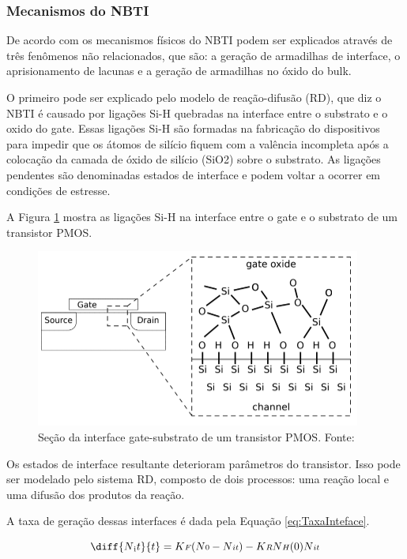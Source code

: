 \subsubsection{Mecanismos do NBTI}

De acordo com \cite{Zeng} os mecanismos físicos do NBTI podem ser explicados através de três fenômenos não relacionados, que são: a geração de armadilhas de interface, o aprisionamento de lacunas e a geração de armadilhas no óxido do bulk.

O primeiro pode ser explicado pelo modelo de reação-difusão (RD), que diz o NBTI é causado por ligações Si-H quebradas na interface entre o substrato e o oxido do gate. Essas ligações Si-H são formadas na fabricação do dispositivos para impedir que os átomos de silício fiquem com a valência incompleta após a colocação da camada de óxido de silício (SiO\small{2}) sobre o substrato. As ligações pendentes são denominadas estados de interface e podem voltar a ocorrer em condições de estresse.

A Figura \ref{fig:PmosCrossSec} mostra as ligações Si-H na interface entre o gate e o substrato de um transistor PMOS.

\begin{figure}[H]
    \centering
    \includegraphics[scale=1]{figures/ReferencialTeorico/Cross section of a PMOS transistor.png}
    \caption{Seção da interface gate-substrato de um transistor PMOS. Fonte: \cite{Lorenz}}
    \label{fig:PmosCrossSec}
\end{figure}

Os estados de interface resultante deterioram parâmetros do transistor. Isso pode ser modelado pelo sistema RD, composto de dois processos: uma reação local e uma difusão dos produtos da reação.

A taxa de geração dessas interfaces é dada pela Equação \ref{eq:TaxaInteface}.

\begin{equation}
    \label{eq:TaxaInteface}
    \diff{N{\textsubscript it}}{t} = K{\scriptstyle F}(N{\scriptstyle 0} - N{\scriptstyle it}) - K{\scriptstyle R}N{\scriptstyle H}(0)N{\scriptstyle it}
\end{equation}

